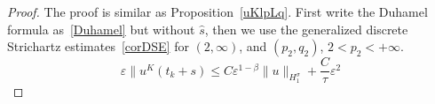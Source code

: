 \documentclass[10pt,a4paper]{article}
\newtheorem{remark}[theorem]{Remark}
\begin{document}
  \begin{proof}
    The proof is similar as Proposition~\ref{uKlpLq}. First write the Duhamel
    formula as~\eqref{Duhamel} but without \(\hat{s}\), then we use the generalized
    discrete Strichartz estimates~\ref{corDSE} for \((2,\infty)\),
    and \((p_2,q_2)\), \(2 < p_2 < +\infty\). 
    \[ \varepsilon \| u^K(t_k+s) \leq C \varepsilon^{1-\beta} \| u
    \|_{H^\sigma_1} + \frac{C}\tau \varepsilon^2 \]
  \end{proof}

  

\end{document}
